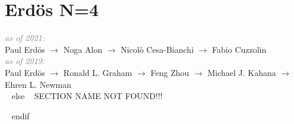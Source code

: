 \section{Erdös N=4}

\textit{\textcolor{grey}{as of 2021:}}\\
Paul Erdös $\rightarrow$ Noga Alon $\rightarrow$ Nicolò Cesa-Bianchi $\rightarrow$ Fabio Cuzzolin\\

\textit{\textcolor{grey}{as of 2019:}}\\
Paul Erdös $\rightarrow$ Ronald L. Graham $\rightarrow$ Feng Zhou $\rightarrow$ Michael J. Kahana $\rightarrow$ Ehren L. Newman\\





~{ else }~
SECTION NAME NOT FOUND!!!


~{ endif }~











